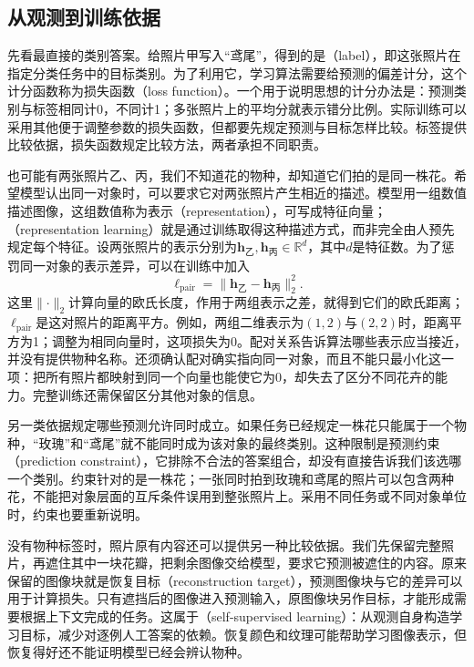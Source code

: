 \subsection{从观测到训练依据}
\label{sec:knowledge-acquisition-observation-supervision}

先看最直接的类别答案。给照片甲写入“鸢尾”，得到的是（label），即这张照片在指定分类任务中的目标类别。为了利用它，学习算法需要给预测的偏差计分，这个计分函数称为损失函数（loss function）。一个用于说明思想的计分办法是：预测类别与标签相同计0，不同计1；多张照片上的平均分就表示错分比例。实际训练可以采用其他便于调整参数的损失函数，但都要先规定预测与目标怎样比较。标签提供比较依据，损失函数规定比较方法，两者承担不同职责。

也可能有两张照片乙、丙，我们不知道花的物种，却知道它们拍的是同一株花。希望模型认出同一对象时，可以要求它对两张照片产生相近的描述。模型用一组数值描述图像，这组数值称为表示（representation），可写成特征向量；（representation learning）就是通过训练取得这种描述方式，而非完全由人预先规定每个特征。设两张照片的表示分别为$\bm{h}_{\text{乙}},\bm{h}_{\text{丙}}\in\mathbb{R}^{d}$，其中$d$是特征数。为了惩罚同一对象的表示差异，可以在训练中加入
\[
  \ell_{\mathrm{pair}}
  =\lVert\bm{h}_{\text{乙}}-\bm{h}_{\text{丙}}\rVert_2^2.
\]
这里$\lVert\cdot\rVert_2$计算向量的欧氏长度，作用于两组表示之差，就得到它们的欧氏距离；$\ell_{\mathrm{pair}}$是这对照片的距离平方。例如，两组二维表示为$(1,2)$与$(2,2)$时，距离平方为1；调整为相同向量时，这项损失为0。配对关系告诉算法哪些表示应当接近，并没有提供物种名称。还须确认配对确实指向同一对象，而且不能只最小化这一项：把所有照片都映射到同一个向量也能使它为0，却失去了区分不同花卉的能力。完整训练还需保留区分其他对象的信息。

另一类依据规定哪些预测允许同时成立。如果任务已经规定一株花只能属于一个物种，“玫瑰”和“鸢尾”就不能同时成为该对象的最终类别。这种限制是预测约束（prediction constraint），它排除不合法的答案组合，却没有直接告诉我们该选哪一个类别。约束针对的是一株花；一张同时拍到玫瑰和鸢尾的照片可以包含两种花，不能把对象层面的互斥条件误用到整张照片上。采用不同任务或不同对象单位时，约束也要重新说明。

没有物种标签时，照片原有内容还可以提供另一种比较依据。我们先保留完整照片，再遮住其中一块花瓣，把剩余图像交给模型，要求它预测被遮住的内容。原来保留的图像块就是恢复目标（reconstruction target），预测图像块与它的差异可以用于计算损失。只有遮挡后的图像进入预测输入，原图像块另作目标，才能形成需要根据上下文完成的任务。这属于（self-supervised learning）：从观测自身构造学习目标，减少对逐例人工答案的依赖。恢复颜色和纹理可能帮助学习图像表示，但恢复得好还不能证明模型已经会辨认物种。

